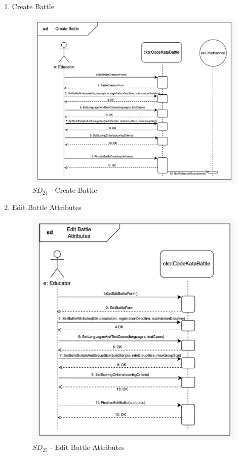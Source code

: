 \begin{enumerate}
    \newpage
    \item Create Battle
    \begin{figure}[H]
        \centering
        \includegraphics[scale=0.2]{Images/sequence_diagrams/SD-create_battle.jpeg}
        \caption{$SD_{24}$ - Create Battle}
    \end{figure}
    \newpage
    \item Edit Battle Attributes
    \begin{figure}[H]
        \centering
        \includegraphics[scale=0.2]{Images/sequence_diagrams/SD-edit_battle_attributes.jpeg}
        \caption{$SD_{25}$ - Edit Battle Attributes}
    \end{figure}
\end{enumerate}
\newpage
